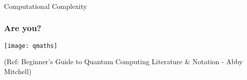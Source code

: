 \begin{frame}[fragile]\frametitle{}
\begin{center}
{\Large Computational Complexity}
\end{center}

\end{frame}


 \begin{frame}[fragile]\frametitle{Are you?}

\begin{center}
\texttt{[image: qmaths]}
\end{center}

\tiny{(Ref: Beginner’s Guide to Quantum Computing Literature \& Notation - Abby Mitchell)}

\end{frame}

